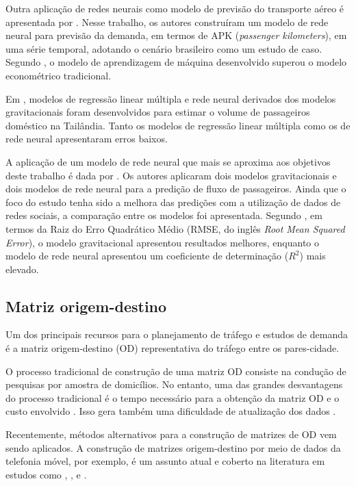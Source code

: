\documentclass[a4paper,9pt,twocolumn,twoside,]{pinp}
\begin{document}
Outra aplicação de redes neurais como modelo de previsão do transporte
aéreo é apresentada por \citet{alekseev_multivariate_2009}. Nesse
trabalho, os autores construíram um modelo de rede neural para previsão
da demanda, em termos de APK (\emph{passenger kilometers}), em uma série
temporal, adotando o cenário brasileiro como um estudo de caso. Segundo
\citet{alekseev_multivariate_2009}, o modelo de aprendizagem de máquina
desenvolvido superou o modelo econométrico tradicional.

Em \citet{erjongmanee_air_2018}, modelos de regressão linear múltipla e
rede neural derivados dos modelos gravitacionais foram desenvolvidos
para estimar o volume de passageiros doméstico na Tailândia. Tanto os
modelos de regressão linear múltipla como os de rede neural apresentaram
erros baixos.

A aplicação de um modelo de rede neural que mais se aproxima aos
objetivos deste trabalho é dada por \citet{pourebrahim_enhancing_2018}.
Os autores aplicaram dois modelos gravitacionais e dois modelos de rede
neural para a predição de fluxo de passageiros. Ainda que o foco do
estudo tenha sido a melhora das predições com a utilização de dados de
redes sociais, a comparação entre os modelos foi apresentada. Segundo
\citet{pourebrahim_enhancing_2018}, em termos da Raiz do Erro Quadrático
Médio (RMSE, do inglês \emph{Root Mean Squared Error}), o modelo
gravitacional apresentou resultados melhores, enquanto o modelo de rede
neural apresentou um coeficiente de determinação (\(R^2\)) mais elevado.

\hypertarget{matriz-origem-destino}{%
\subsection{Matriz origem-destino}\label{matriz-origem-destino}}

Um dos principais recursos para o planejamento de tráfego e estudos de
demanda é a matriz origem-destino (OD) representativa do tráfego entre
os pares-cidade.

O processo tradicional de construção de uma matriz OD consiste na
condução de pesquisas por amostra de domicílios. No entanto, uma das
grandes desvantagens do processo tradicional é o tempo necessário para a
obtenção da matriz OD e o custo envolvido
\citep{calabrese_estimating_2011}. Isso gera também uma dificuldade de
atualização dos dados \citep{fekih_data-driven_2020}.

Recentemente, métodos alternativos para a construção de matrizes de OD
vem sendo aplicados. A construção de matrizes origem-destino por meio de
dados da telefonia móvel, por exemplo, é um assunto atual e coberto na
literatura em estudos como \citet{calabrese_estimating_2011},
\citet{fekih_data-driven_2020}, \citet{friedrich_generating_2010} e
\citet{mellegard_origindestination-estimation_2011}.
\end{document}
